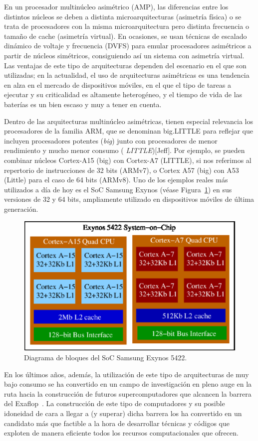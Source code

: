 En un procesador multinúcleo asimétrico (AMP), las diferencias entre los
distintos núcleos se deben a distinta microarquitecturas (asimetría física)
o se trata de procesadores con la misma microarquitectura pero distinta
frecuencia o tamaño de cache (asimetría virtual). En ocasiones, se usan
técnicas de escalado dinámico de voltaje y frecuencia (DVFS) para emular
procesadores asimétricos a partir de núcleos simétricos, consiguiendo así
un sistema con asimetría virtual. Las ventajas de este tipo de
arquitecturas dependen del escenario en el que son utilizadas; en la
actualidad, el uso de arquitecturas asimétricas es una tendencia en alza en
el mercado de dispositivos móviles, en el que el tipo de tareas a ejecutar y
su criticalidad es altamente heterogéneo, y el tiempo de vida de las
baterías es un bien escaso y muy a tener en cuenta.

Dentro de las arquitecturas multinúcleo asimétricas, tienen especial
relevancia los procesadores de la familia ARM, que se denominan big.LITTLE
para reflejar que incluyen procesadores potentes ({\em big}) junto con
procesadores de menor rendimiento y mucho menor consumo ({\em
  LITTLE})[Jeff]. Por ejemplo, se pueden combinar núcleos Cortex-A15 (big)
con Cortex-A7 (LITTLE), si nos referimos al repertorio de instrucciones de
32 bits (ARMv7), o Cortex A57 (big) con A53 (Little) para el caso de 64
bits (ARMv8). Uno de los ejemplos reales más utilizados a día de hoy es el
SoC Samsung Exynos (véase Figura~\ref{fig:exynos}) en sus versiones de 32 y
64 bits, ampliamente utilizado en dispositivos móviles de última
generación.

\begin{figure}[th!]
\begin{center}
\includegraphics[width=0.4\columnwidth]{Figures/Exynos.eps}
\end{center}
\caption{\label{fig:exynos} Diagrama de bloques del SoC Samsung Exynos 5422.}
\end{figure}

En los últimos años, además, la utilización de este tipo de arquitecturas de muy bajo consumo se ha
convertido en un campo de investigación en pleno auge en la ruta hacia la construcción de futuros
supercomputadores que alcancen la barrera del Exaflop~\cite{Road,MontBlanc}. La construcción
de este tipo de computadores y su posible idoneidad de cara a llegar a (y superar) dicha barrera
los ha convertido en un candidato más que factible a la hora de desarrollar técnicas y códigos
que exploten de manera eficiente todos los recursos computacionales que ofrecen.

